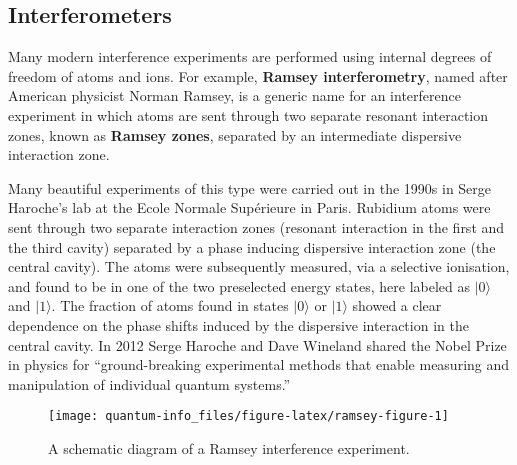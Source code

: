 \documentclass[fleqn]{article}
\begin{document}
\hypertarget{interferometers}{%
\subsection{Interferometers}\label{interferometers}}

Many modern interference experiments are performed using internal degrees of freedom of atoms and ions. For example, \textbf{Ramsey interferometry}, named after American physicist Norman Ramsey, is a generic name for an interference experiment in which atoms are sent through two separate resonant interaction zones, known as \textbf{Ramsey zones}, separated by an intermediate dispersive interaction zone.

Many beautiful experiments of this type were carried out in the 1990s in Serge Haroche's lab at the Ecole Normale Supérieure in Paris. Rubidium atoms were sent through two separate interaction zones (resonant interaction in the first and the third cavity) separated by a phase inducing dispersive interaction zone (the central cavity). The atoms were subsequently measured, via a selective ionisation, and found to be in one of the two preselected energy states, here labeled as \(|0\rangle\) and \(|1\rangle\). The fraction of atoms found in states \(|0\rangle\) or \(|1\rangle\) showed a clear dependence on the phase shifts induced by the dispersive interaction in the central cavity. In 2012 Serge Haroche and Dave Wineland shared the Nobel Prize in physics for ``ground-breaking experimental methods that enable measuring and manipulation of individual quantum systems.''



\begin{figure}[H]

{\centering \texttt{[image: quantum-info\_files/figure-latex/ramsey-figure-1]} 

}

\caption{A schematic diagram of a Ramsey interference experiment.}\label{fig:ramsey-figure}
\end{figure}
\end{document}
